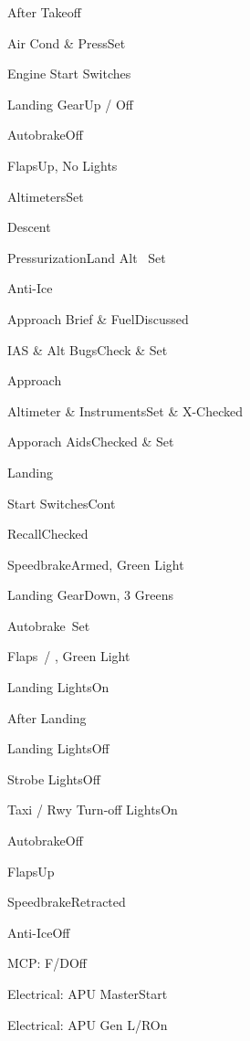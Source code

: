 \documentclass[sim-use]{checklist}
\begin{document}
\begin{checklist}{After Takeoff}
  \item{Air Cond \& Press}{Set}
  \item{Engine Start Switches}{\blank}
  \item{Landing Gear}{Up / Off}
  \item{Autobrake}{Off}
  \item{Flaps}{Up, No Lights}
  \item{Altimeters}{Set}
\end{checklist}

\begin{checklist}{Descent}
  \item{Pressurization}{Land Alt \blank\ Set}
  \item{Anti-Ice}{\blank}
  \item{Approach Brief \& Fuel}{Discussed}
  \item{IAS \& Alt Bugs}{Check \& Set}
\end{checklist}

\begin{checklist}{Approach}
  \item{Altimeter \& Instruments}{Set \& X-Checked}
  \item{Apporach Aids}{Checked \& Set}
\end{checklist}

\begin{checklist}{Landing}
  \item{Start Switches}{Cont}
  \item{Recall}{Checked}
  \item{Speedbrake}{Armed, Green Light}
  \item{Landing Gear}{Down, 3 Greens}
  \item{Autobrake}{\blank\ Set}
  \item{Flaps}{\blank\ / \blank, Green Light}
  \item{Landing Lights}{On}
\end{checklist}

\begin{checklist}{After Landing}
  \item{Landing Lights}{Off}
  \item{Strobe Lights}{Off}
  \item{Taxi / Rwy Turn-off Lights}{On}
  \item{Autobrake}{Off}
  \item{Flaps}{Up}
  \item{Speedbrake}{Retracted}
  \item{Anti-Ice}{Off}
  \item{MCP: F/D}{Off}
  \item{Electrical: APU Master}{Start}
  \item{Electrical: APU Gen L/R}{On}
\end{checklist}
\end{document}
